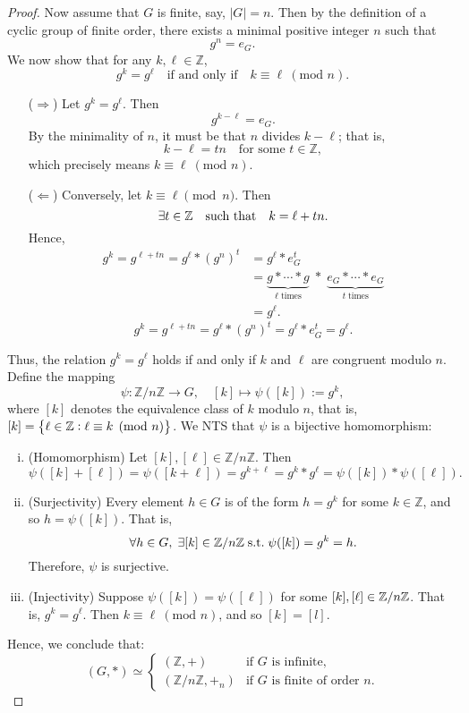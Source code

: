 \documentclass[11pt,openany]{article}
\begin{document}
\begin{proof}
Now assume that \(G\) is finite, say, \(|G|=n\). Then by the definition of a cyclic group of finite order, there exists a minimal positive integer \(n\) such that
\[
g^n = e_G.
\]
We now show that for any \(k,\ell\in \mathbb{Z}\), \[
g^k = g^\ell \quad \text{if and only if} \quad k\equiv \ell \ (\text{mod } n).
\] \begin{itemize}
	\item[($\Rightarrow$)] Let \(g^k = g^\ell\). Then
	\[
	g^{k-\ell}=e_G.
	\]
	By the minimality of \(n\), it must be that \(n\) divides \(k-\ell\); that is,
	\[
	k-\ell = tn \quad \text{for some } t\in \mathbb{Z},
	\]
	which precisely means \(k\equiv \ell \ (\text{mod } n)\).
	\item[($\Leftarrow$)] Conversely, let \(k\equiv \ell \pmod{n}\). Then \[
	\exists t\in\mathbb{Z}\quad \text{such that}\quad k = \ell + tn.
	\]
	Hence, \begin{align*}
		g^k = g^{\ell + tn} = g^\ell \ast (g^n)^t &= g^\ell \ast e_G^t\\
		&=\underbrace{g\ast\cdots\ast g}_{\ell\; \text{times}}\; \ast\; \underbrace{e_G\ast \cdots\ast e_G}_{t\; \text{times}}\\
		&=g^\ell.
	\end{align*}
	\[
	g^k = g^{\ell + tn} = g^\ell \ast (g^n)^t = g^\ell \ast e_G^t = g^\ell.
	\]
\end{itemize}
Thus, the relation \(g^k = g^\ell\) holds if and only if \(k\) and \(\ell\) are congruent modulo \(n\).
Define the mapping\[
\psi: \mathbb{Z}/n\mathbb{Z} \to G,\quad [k]\mapsto \psi([k]):=g^k,
\] where \([k]\) denotes the equivalence class of \(k\) modulo \(n\), that is, $[k]=\set{\ell\in\mathbb{Z}:\ell\equiv k \pmod{n} }$.
We NTS that \(\psi\) is a bijective homomorphism:
\begin{enumerate}[(i)]
	\item (Homomorphism)\; Let \([k],[\ell]\in \mathbb{Z}/n\mathbb{Z}\). Then
	\[
	\psi([k]+[\ell]) = \psi([k+\ell]) = g^{k+\ell} = g^k \ast g^\ell = \psi([k]) \ast \psi([\ell]).
	\]
	\item (Surjectivity)\; Every element \(h\in G\) is of the form \(h=g^k\) for some \(k\in \mathbb{Z}\), and so \(h=\psi([k])\).  That is, \[
	\forall h\in G,\; \exists [k]\in\mathbb{Z}/n\mathbb{Z}\; \text{s.t.}\; \psi([k])=g^k = h.
	\] Therefore, \(\psi\) is surjective.
	\item (Injectivity)\; Suppose \(\psi([k])=\psi([\ell])\) for some $[k],[\ell]\in\mathbb{Z}/n\mathbb{Z}$. That is, \(g^k=g^\ell\). Then \(k\equiv \ell\ (\text{mod } n)\), and so $[k]=[l]$.
\end{enumerate}
Hence, we conclude that:
\[
(G,\ast) \simeq
\begin{cases}
	(\mathbb{Z},+) & \text{if } G \text{ is infinite,} \\
	(\mathbb{Z}/n\mathbb{Z},+_n) & \text{if } G \text{ is finite of order } n.
\end{cases}
\]
\end{proof}
\end{document}
